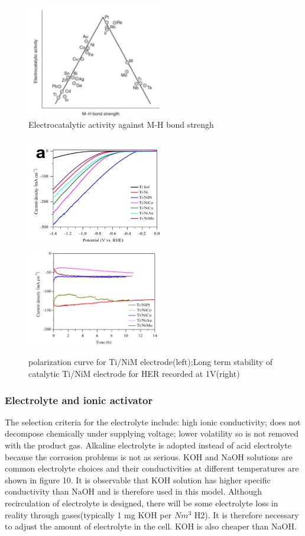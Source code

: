 \begin{figure}[H] 
\centering
\includegraphics[width=6cm]{catalyst.png}
\caption{Electrocatalytic activity against M-H bond strengh\cite{cathode2}}
\end{figure}

\begin{figure}[H] 
\centering
\includegraphics[width=6cm]{polarization.png}
\includegraphics[width=6cm]{stability.png}
\caption{polarization curve for Ti/NiM electrode(left);Long term stability of catalytic Ti/NiM electrode for HER recorded at 1V(right) \cite{cathode}}
\end{figure}


\subsubsection{Electrolyte and ionic activator}
The selection criteria for the electrolyte include: high ionic conductivity;  does not decompose chemically under supplying voltage; lower volatility so is not removed with the product gas. Alkaline electrolyte is adopted instead of acid electrolyte because the corrosion problems is not as serious. KOH and NaOH solutions are common electrolyte choices and their conductivities at different temperatures are shown in figure 10. It is observable that KOH solution has higher specific conductivity than NaOH and is therefore used in this model. Although recirculation of electrolyte is designed, there will be some electrolyte loss in reality through gases(typically 1 mg KOH per $Nm^3$ H2). It is therefore necessary to adjust the amount of electrolyte in the cell. KOH is also cheaper than NaOH.


